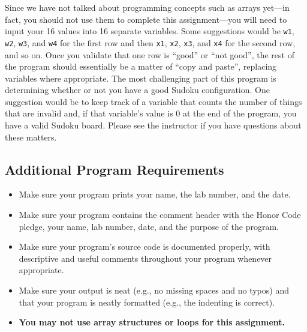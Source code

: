 Since we have not talked about programming concepts such as arrays yet---in fact, you should not use them to complete
this assignment---you will need to input your 16 values into 16 separate variables.  Some suggestions would be {\tt w1},
{\tt w2}, {\tt w3}, and {\tt w4} for the first row and then {\tt x1}, {\tt x2}, {\tt x3}, and {\tt x4} for the second
row, and so on.  Once you validate that one row is ``good'' or ``not good'', the rest of the program should essentially
be a matter of ``copy and paste'', replacing variables where appropriate.  The most challenging part of this program is
determining whether or not you have a good Sudoku configuration.  One suggestion would be to keep track of a variable
that counts the number of things that are invalid and, if that variable's value is 0 at the end of the program, you have
a valid Sudoku board. Please see the instructor if you have questions about these matters.

\vspace{-0.1in}
\subsection*{Additional Program Requirements}
\vspace{-0.05in}
\begin{itemize}

\itemsep0in

\item Make sure your program prints your name, the lab number, and the date.

\item Make sure your program contains the comment header with the Honor Code pledge, your name, lab number, date, and
  the purpose of the program.

\item Make sure your program's source code is documented properly, with descriptive and useful comments throughout your
  program whenever appropriate.

\item Make sure your output is neat (e.g., no missing spaces and no typos) and that your program is neatly formatted
  (e.g., the indenting is correct).

\item \textbf{You may not use array structures or loops for this assignment.}

\end{itemize}

\vspace{-0.25in}
